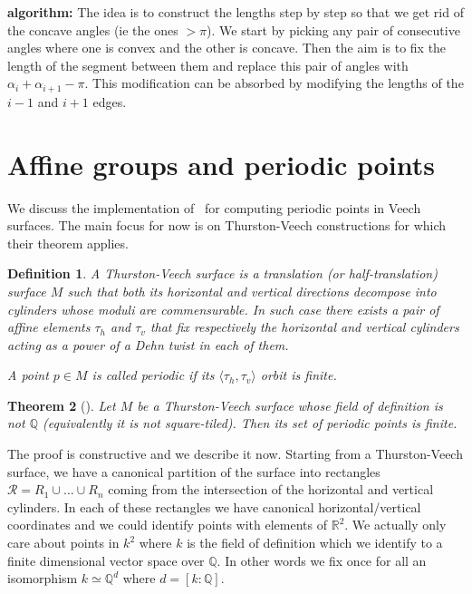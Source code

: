 \documentclass[a4paper,12pt]{article}
\def\bR{\mathbb{R}}
\def\bQ{\mathbb{Q}}
\newtheorem{definition}{Definition}
\newtheorem{theorem}[definition]{Theorem}
\begin{document}
\textbf{algorithm:}
The idea is to construct the lengths step by step so that we get rid of the concave angles
(ie the ones $> \pi$). We start by picking any pair of consecutive angles where one is
convex and the other is concave. Then the aim is to fix the length of the segment between
them and replace this pair of angles with $\alpha_i + \alpha_{i+1} - \pi$. This modification can be absorbed by modifying the lengths of the $i-1$ and $i+1$ edges.


\section{Affine groups and periodic points}
We discuss the implementation of~\cite{ChowdhuryEverettFreedmanLee} for computing
periodic points in Veech surfaces. The main focus for now is on Thurston-Veech
constructions for which their theorem applies.

\begin{definition}
A \emph{Thurston-Veech surface} is a translation (or half-translation) surface $M$ such
that both its horizontal and vertical directions decompose into cylinders
whose moduli are commensurable. In such case there exists a pair of affine
elements $\tau_h$ and $\tau_v$ that fix respectively the horizontal and
vertical cylinders acting as a power of a Dehn twist in each of them.

A point $p \in M$ is called \emph{periodic} if its $\langle \tau_h, \tau_v \rangle$
orbit is finite.
\end{definition}

\begin{theorem}[\cite{ChowdhuryEverettFreedmanLee}]
Let $M$ be a Thurston-Veech surface whose field of definition is not $\bQ$
(equivalently it is not square-tiled). Then its set of periodic points
is finite.
\end{theorem}

The proof is constructive and we describe it now.
Starting from a Thurston-Veech surface, we have a canonical partition of the
surface into rectangles $\mathcal{R} = R_1 \cup \ldots \cup R_n$ coming
from the intersection of the horizontal and vertical cylinders. In each
of these rectangles we have canonical horizontal/vertical coordinates and we could
identify points with elements of $\bR^2$. We actually only care about points
in $k^2$ where $k$ is the field of definition which we identify to a finite
dimensional vector space over $\bQ$. In other words we fix once for
all an isomorphism $k \simeq \bQ^d$ where $d = [k:\bQ]$.
\end{document}
